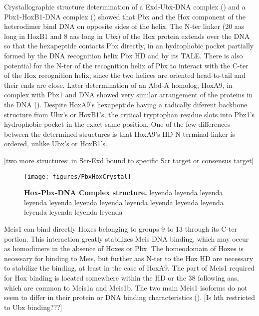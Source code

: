 Crystallographic structure determination of a Exd-Ubx-DNA complex (\cite{Passner1999}) and a Pbx1-HoxB1-DNA complex (\cite{Piper1999}) showed that Pbx and the Hox component of the heterodimer bind DNA on opposite sides of the helix. The \ac{N-ter} linker (20 \acp{aa} long in HoxB1 and 8 \acp{aa} long in Ubx) of the Hox protein extends over the DNA so that the hexapeptide contacts Pbx directly, in an hydrophobic pocket partially formed by the DNA recognition helix Pbx \ac{HD} and by its \ac{TALE}. There is also potential for the \ac{N-ter} of the recognition helix of Pbx to interact with the \ac{C-ter} of the Hox recognition helix, since the two helices are oriented head-to-tail and their ends are close. Later determination of an \ac{Abd-A} homolog, HoxA9, in complex with Pbx1 and DNA showed very similar arrangement of the proteins in the DNA (\cite{LaRonde-LeBlanc2003}). Despite HoxA9's hexapeptide having a radically diferent backbone structure from Ubx's or HoxB1's, the critical tryptophan residue slots into Pbx1's hydrophobic pocket in the exact same position. One of the few differences between the determined structures is that HoxA9's \ac{HD} N-terminal linker is ordered, unlike Ubx's or HoxB1's.

[two more structures: in \cite{Joshi2007} Scr-Exd bound to specific Scr target or consensus target]

\begin{figure}[]
  
  \centering
  \texttt{[image: figures/PbxHoxCrystal]}
  \caption[Hox-Pbx-DNA Complex structure]{\textbf{Hox-Pbx-DNA Complex structure.} leyenda leyenda leyenda leyenda leyenda leyenda leyenda leyenda leyenda leyenda leyenda leyenda leyenda leyenda leyenda}
  \label{fig:PbxHoxCrystal}
\end{figure}

Meis1 can bind directly Hoxes belonging to groups 9 to 13 through its \ac{C-ter} portion. This interaction greatly stabilizes Meis DNA binding, which may occur as homodimers in the absence of Hoxes or Pbx. The homeodomain of Hoxes is necessary for binding to Meis, but further \acp{aa} \ac{N-ter} to the Hox \ac{HD} are necessary to stabilize the binding, at least in the case of HoxA9. The part of Meis1 required for Hox binding is located somewhere within the \ac{HD} or the 38 following \acp{aa}, which are common to Meis1a and Meis1b. The two main Meis1 isoforms do not seem to differ in their protein or DNA binding characteristics (\cite{Shen1997}). [Is hth restricted to Ubx binding???]

